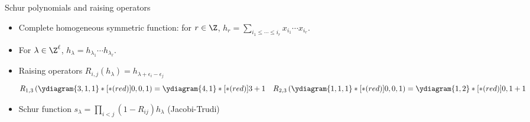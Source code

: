 \documentclass{beamer}
\DeclareMathOperator{\Gr}{Gr}
\theoremstyle{definition}
\begin{document}
\begin{frame}{Schur polynomials and raising operators}
  \begin{itemize}
  \item Complete homogeneous symmetric function: for \(r \in \Z\), \(h_r = \sum_{i_1 \leq \cdots \leq i_r} x_{i_1}
    \cdots x_{i_r}\). \pause
  \item For \(\lambda \in \Z^\ell\), \(h_\lambda = h_{\lambda_1}
    \cdots h_{\lambda_\ell}\). \pause
  \item Raising operators
    \(R_{i,j}(h_\lambda) = h_{\lambda+\epsilon_i-\epsilon_j}\)
    \[
      R_{1,3} \left( \ydiagram{3,1,1}*[*(red)]{0,0,1} \right) =
      \ydiagram{4,1}*[*(red)]{3+1} \ \ \ R_{2,3} \left(
        \ydiagram{1,1,1}*[*(red)]{0,0,1} \right) =
      \ydiagram{1,2}*[*(red)]{0,1+1}
    \] \pause
  \item Schur function \(s_\lambda = \prod_{i < j} (1-R_{ij})h_\lambda\) (Jacobi-Trudi) 
  \end{itemize}
\end{frame}
\end{document}
